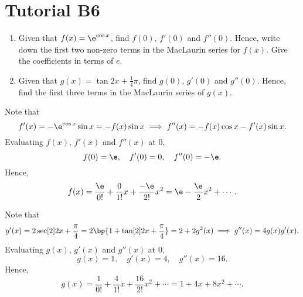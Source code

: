 \section{Tutorial B6}

\begin{problem}
    \begin{enumerate}
        \item Given that $f(x) = \e^{\cos x}$, find $f(0)$, $f'(0)$ and $f''(0)$. Hence, write down the first two non-zero terms in the MacLaurin series for $f(x)$. Give the coefficients in terms of $e$.
        \item Given that $g(x) = \tan{2x + \frac14 \pi }$, find $g(0)$, $g'(0)$ and $g''(0)$. Hence, find the first three terms in the MacLaurin series of $g(x)$.
    \end{enumerate}
\end{problem}
\begin{solution}
    \begin{ppart}
        Note that \[f'(x) = -\e^{\cos x} \sin x  = -f(x) \sin x \implies f''(x) = -f(x) \cos x  -f'(x) \sin x .\] Evaluating $f(x)$, $f'(x)$ and $f''(x)$ at 0, \[f(0) = \e, \quad f'(0) = 0, \quad f''(0) = -\e.\] Hence, \[f(x) = \frac{\e}{0!} + \frac{0}{1!} x + \frac{-\e}{2!} x^2 = \e - \frac{\e}{2}x^2 + \cdots.\]
    \end{ppart}
    \begin{ppart}
        Note that \[g'(x) = 2\sec[2]{2x + \frac\pi4} = 2\bp{1 + \tan[2]{2x + \frac\pi4}} = 2 + 2g^2(x) \implies g''(x) = 4g(x)g'(x).\] Evaluating $g(x)$, $g'(x)$ and $g''(x)$ at 0, \[g(x) = 1, \quad g'(x) = 4, \quad g''(x) = 16.\] Hence, \[g(x) = \frac{1}{0!} + \frac{4}{1!} x + \frac{16}{2!} x^2 + \cdots = 1 + 4x + 8x^2 + \cdots.\]
    \end{ppart}
\end{solution}


